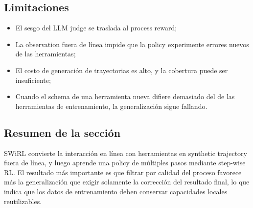 

\subsection{Limitaciones}

\begin{itemize}
    \item El sesgo del LLM judge se traslada al process reward;
    \item La observation fuera de línea impide que la policy experimente errores nuevos de las herramientas;
    \item El costo de generación de trayectorias es alto, y la cobertura puede ser insuficiente;
    \item Cuando el schema de una herramienta nueva difiere demasiado del de las herramientas de entrenamiento, la generalización sigue fallando.
\end{itemize}

\subsection{Resumen de la sección}

SWiRL convierte la interacción en línea con herramientas en synthetic trajectory fuera de línea, y luego aprende una policy de múltiples pasos mediante step-wise RL. El resultado más importante es que filtrar por calidad del proceso favorece más la generalización que exigir solamente la corrección del resultado final, lo que indica que los datos de entrenamiento deben conservar capacidades locales reutilizables.
